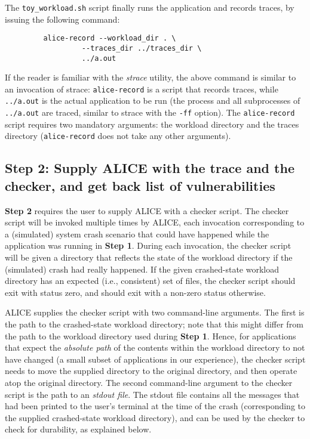 \documentclass[oneside]{memoir}
\begin{document}
The \verb;toy_workload.sh; script finally runs the application and records traces, by issuing the following command:

\begin{verbatim}
         alice-record --workload_dir . \
                  --traces_dir ../traces_dir \
                  ../a.out
\end{verbatim}

If the reader is familiar with the \textit{strace} utility, the above command is similar to an invocation of strace: \verb;alice-record; is a script that records traces, while \verb;../a.out; is the actual application to be run (the process and all subprocesses of \verb;../a.out; are traced, similar to strace with the \verb;-ff; option). The \verb;alice-record; script requires two mandatory arguments: the workload directory and the traces directory (\verb;alice-record; does not take any other arguments).

\subsection{Step 2: Supply ALICE with the trace and the checker, and get back list of vulnerabilities}
\textbf{Step 2} requires the user to supply ALICE with a checker script. The checker script will be invoked multiple times by ALICE, each invocation corresponding to a (simulated) system crash scenario that could have happened while the application was running in \textbf{Step 1}. During each invocation, the checker script will be given a directory that reflects the state of the workload directory if the (simulated) crash had really happened. If the given crashed-state workload directory has an expected (i.e., consistent) set of files, the checker script should exit with status zero, and should exit with a non-zero status otherwise.

ALICE supplies the checker script with two command-line arguments. The first is the path to the crashed-state workload directory; note that this might differ from the path to the workload directory used during \textbf{Step 1}. Hence, for applications that expect the \textit{absolute path} of the contents within the workload directory to not have changed (a small subset of applications in our experience), the checker script needs to move the supplied directory to the original directory, and then operate atop the original directory. The second command-line argument to the checker script is the path to an \textit{stdout file}. The stdout file contains all the messages that had been printed to the user's terminal at the time of the crash (corresponding to the supplied crashed-state workload directory), and can be used by the checker to check for durability, as explained below.
\end{document}
